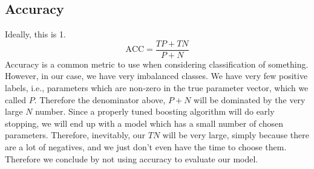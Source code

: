 \subsection{Accuracy}
Ideally, this is 1.
\begin{equation}\label{eq:accuracy}
    \text{ACC}=\frac{TP+TN}{P+N}
\end{equation}
Accuracy is a common metric to use when considering classification of something. However, in our case, we have very imbalanced classes. We have very few positive labels, i.e., parameters which are non-zero in the true parameter vector, which we called $P$. Therefore the denominator above, $P+N$ will be dominated by the very large $N$ number. Since a properly tuned boosting algorithm will do early stopping, we will end up with a model which has a small number of chosen parameters. Therefore, inevitably, our $TN$ will be very large, simply because there are a lot of negatives, and we just don't even have the time to choose them. Therefore we conclude by not using accuracy to evaluate our model.

